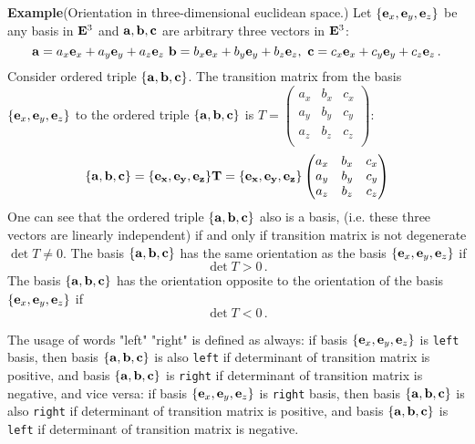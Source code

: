 \documentclass[12pt]{article}
\numberwithin{equation}{section}
\begin{document}
{\bf Example}(Orientation in three-dimensional euclidean space.)
Let $\{{\bf e}_x,{\bf e}_y,{\bf e}_z\}$ be any basis in ${\bf E}^3$ and
 ${\bf a},{\bf b},\bf {\bf c}$ are  arbitrary three vectors in ${\bf E}^3$:
                            $$
  {\bf a}=a_x{\bf e}_x+a_y{\bf e}_y+a_z{\bf e}_z\,\,{\bf b}=b_x{\bf e}_x+b_y{\bf e}_y+b_z{\bf e}_z,\,\,{\bf c}=c_x{\bf e}_x+c_y{\bf e}_y+c_z{\bf e}_z\,.
                           $$
   Consider ordered triple $\{{\bf a},{\bf b},{\bf c}\}$.
  The transition matrix from the basis $\{{\bf e}_x,{\bf e}_y,{\bf e}_z\}$ to the  ordered triple
  $\{{\bf a},{\bf b},\bf {\bf c}\}$
  is $
           T=
                     \begin{pmatrix}
                 a_x   & b_x  &c_x \\
                  a_y   & b_y  &c_y\\
                   a_z   & b_z  &c_z\\
                  \end{pmatrix}
                      $:
                      $$
\{{\bf a},{\bf b},\bf {\bf c}\}=\{{\bf e}_x,{\bf e}_y,{\bf e}_z\}T= \{{\bf e}_x,{\bf e}_y,{\bf e}_z\}
                    \begin{pmatrix}
                 a_x   & b_x  &c_x \\
                  a_y   & b_y  &c_y\\
                   a_z   & b_z  &c_z\\
                  \end{pmatrix}
                      $$
One can see that the ordered triple  $\{{\bf a},{\bf b},\bf {\bf c}\}$ also is a basis, (i.e. these three vectors
are  linearly independent)
 if and only if  transition matrix is not degenerate $\det T\not=0$.
 The  basis  $\{{\bf a},{\bf b},{\bf c}\}$ has the same orientation as the basis $\{{\bf e}_x,{\bf e}_y,{\bf e}_z\}$ if
              \begin{equation}\label{conditionofsameorientation1}
                      \det T>0\,.
                   \end{equation}
The basis $\{{\bf a},{\bf b},{\bf c}\}$ has the  orientation opposite to the orientation
of the basis $\{{\bf e}_x,{\bf e}_y,{\bf e}_z\}$ if
        \begin{equation}\label{conditionofoppositeorientation1}
                      \det T<0\,.
                    \end{equation}


\m

The usage of words "left" "right" is defined as always:
if basis $\{{\bf e}_x,{\bf e}_y,{\bf e}_z\}$ is {\tt left} basis, then
basis $\{{\bf a},{\bf b},{\bf c}\}$ is also {\tt left} if determinant of
transition matrix is positive, and 
basis $\{{\bf a},{\bf b},{\bf c}\}$ is  {\tt right} if determinant of
transition matrix is negative, and vice versa:
if basis $\{{\bf e}_x,{\bf e}_y,{\bf e}_z\}$ is {\tt right} basis, then
basis $\{{\bf a},{\bf b},{\bf c}\}$ is also {\tt right} if determinant of
transition matrix is positive, and 
basis $\{{\bf a},{\bf b},{\bf c}\}$ is  {\tt left} if determinant of
transition matrix is negative.
 
\end{document}
